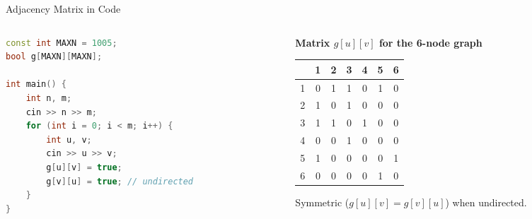 \documentclass{beamer}
\begin{document}
\begin{frame}[fragile]{Adjacency Matrix in Code}
  \begin{columns}[c]
    \begin{column}{0.52\textwidth}
\begin{lstlisting}[language=C++]
const int MAXN = 1005;
bool g[MAXN][MAXN];

int main() {
    int n, m;
    cin >> n >> m;
    for (int i = 0; i < m; i++) {
        int u, v;
        cin >> u >> v;
        g[u][v] = true;
        g[v][u] = true; // undirected
    }
}
\end{lstlisting}
    \end{column}
    \begin{column}{0.44\textwidth}
      \centering
      {\scriptsize\textbf{Matrix $g[u][v]$ for the 6-node graph}}\\[3pt]
      {\scriptsize
      \begin{tabular}{c|cccccc}
          & 1 & 2 & 3 & 4 & 5 & 6 \\\hline
        1 & 0 & 1 & 1 & 0 & 1 & 0 \\
        2 & 1 & 0 & 1 & 0 & 0 & 0 \\
        3 & 1 & 1 & 0 & 1 & 0 & 0 \\
        4 & 0 & 0 & 1 & 0 & 0 & 0 \\
        5 & 1 & 0 & 0 & 0 & 0 & 1 \\
        6 & 0 & 0 & 0 & 0 & 1 & 0
      \end{tabular}}
      \par\vspace{0.4em}
      {\scriptsize Symmetric ($g[u][v] = g[v][u]$) when undirected.}
    \end{column}
  \end{columns}
\end{frame}
\end{document}
